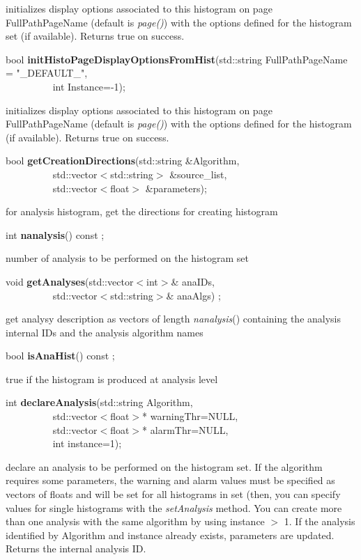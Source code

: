  initializes display options associated to this histogram on page
 FullPathPageName (default is {\it page()}) with the
 options defined for the histogram set (if available). Returns true on
 success.


\item    bool {\bf initHistoPageDisplayOptionsFromHist}(std::string FullPathPageName = "\_DEFAULT\_",\\\mbox{}~~~~~~~~~
					   int Instance=-1);

 initializes display options associated to this histogram on page
 FullPathPageName (default is {\it page()}) with the
 options defined for the histogram (if available). Returns true on
 success.


\item    bool {\bf getCreationDirections}(std::string \&Algorithm,\\\mbox{}~~~~~~~~~
			     std::vector$<$std::string$>$ \&source\_list,\\\mbox{}~~~~~~~~~
			     std::vector$<$float$>$ \&parameters);

 for analysis histogram, get the directions for creating histogram


\item    int {\bf nanalysis}() const ;

 number of analysis to be performed on the histogram set


\item    void {\bf getAnalyses}(std::vector$<$int$>$\& anaIDs,\\\mbox{}~~~~~~~~~
		   std::vector$<$std::string$>$\& anaAlgs) ;

 get analysy description as vectors of length {\it  nanalysis}() containing 
 the analysis internal IDs and the analysis algorithm names


\item    bool {\bf isAnaHist}() const ;

 true if the histogram is produced at analysis level


\item    int {\bf declareAnalysis}(std::string Algorithm,\\\mbox{}~~~~~~~~~ 
		      std::vector$<$float$>$* warningThr=NULL,\\\mbox{}~~~~~~~~~ 
		      std::vector$<$float$>$* alarmThr=NULL,\\\mbox{}~~~~~~~~~ 
		      int instance=1);

 declare an analysis to be performed on the histogram set. If the algorithm
 requires some parameters, the warning and alarm values must be
 specified as vectors of floats and will be set for all histograms in
 set (then, you can specify values for single histograms with the {\it
 setAnalysis} method. 
 You can create more than one analysis
 with the same algorithm by using instance $>$ 1. If the analysis
 identified by Algorithm and instance already exists, parameters are
 updated. Returns the internal analysis ID.


